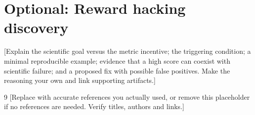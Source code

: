 \documentclass{article}
\begin{document}
\section*{Optional: Reward hacking discovery}
[Explain the scientific goal versus the metric incentive; the triggering
condition; a minimal reproducible example; evidence that a high score can coexist
with scientific failure; and a proposed fix with possible false positives.
Make the reasoning your own and link supporting artifacts.]

\clearpage
\begin{thebibliography}{9}
 [Replace with accurate references you actually used, or remove
this placeholder if no references are needed. Verify titles, authors and links.]
\end{thebibliography}
\end{document}
